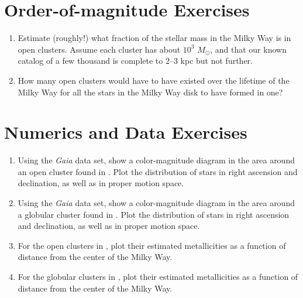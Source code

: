\section{Order-of-magnitude Exercises}

\begin{enumerate} 
\item Estimate (roughly!) what fraction of the stellar mass in
the Milky Way is in open clusters. Assume each cluster has about
    $10^3$ $M_\odot$, and that our known catalog of a few thousand is
    complete to $2$--$3$ kpc but not further.
\item How many open clusters would have to have existed over the
    lifetime of the Milky Way for all the stars in the Milky Way disk
to have formed in one?
\end{enumerate} 

\section{Numerics and Data Exercises}

\begin{enumerate}
\item Using the {\it Gaia} data set, show a color-magnitude
diagram in the area around an open cluster found
in \citet{dias02a}. Plot the distribution of stars in right ascension
and declination, as well as in proper motion space.
\item Using the {\it Gaia} data set, show a color-magnitude
diagram in the area around a globular cluster found
in \citet{harris96a}. Plot the distribution of stars in right
ascension and declination, as well as in proper motion space.
\item For the open clusters in \citet{dias02a}, plot their estimated
metallicities as a function of distance from the center of the Milky
Way.
\item For the globular clusters in \citet{harris96a}, plot their estimated
metallicities as a function of distance from the center of the Milky
Way.
\end{enumerate}


  
